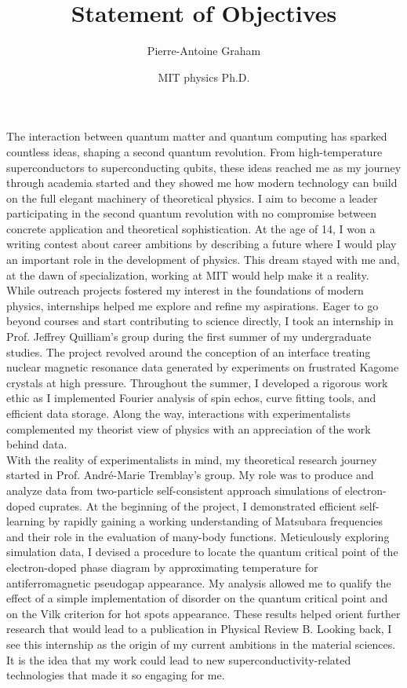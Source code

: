 \documentclass[12pt]{article}
\title{Statement of Objectives}
\author{Pierre-Antoine Graham}
\date{MIT physics Ph.D.}
\begin{document}
\maketitle
\vspace{0.5cm}

The interaction between quantum matter and quantum computing has sparked countless ideas, shaping a second quantum revolution. From high-temperature superconductors to superconducting qubits, these ideas reached me as my journey through academia started and they showed me how modern technology can build on the full elegant machinery of theoretical physics. I aim to become a leader participating in the second quantum revolution with no compromise between concrete application and theoretical sophistication. At the age of 14, I won a writing contest about career ambitions by describing a future where I would play an important role in the development of physics. This dream stayed with me and, at the dawn of specialization, working at MIT would help make it a reality.\\[0.2cm]

While outreach projects fostered my interest in the foundations of modern physics, internships helped me explore and refine my aspirations. Eager to go beyond courses and start contributing to science directly, I took an internship in Prof. Jeffrey Quilliam's group during the first summer of my undergraduate studies. The project revolved around the conception of an interface treating nuclear magnetic resonance data generated by experiments on frustrated Kagome crystals at high pressure. Throughout the summer, I developed a rigorous work ethic as I implemented Fourier analysis of spin echos, curve fitting tools, and efficient data storage. Along the way, interactions with experimentalists complemented my theorist view of physics with an appreciation of the work behind data.\\[0.2cm]

With the reality of experimentalists in mind, my theoretical research journey started in Prof. André-Marie Tremblay's group. My role was to produce and analyze data from two-particle self-consistent approach simulations of electron-doped cuprates. At the beginning of the project, I demonstrated efficient self-learning by rapidly gaining a working understanding of Matsubara frequencies and their role in the evaluation of many-body functions. Meticulously exploring simulation data, I devised a procedure to locate the quantum critical point of the electron-doped phase diagram by approximating temperature for antiferromagnetic pseudogap appearance. My analysis allowed me to qualify the effect of a simple implementation of disorder on the quantum critical point and on the Vilk criterion for hot spots appearance. These results helped orient further research that would lead to a publication in Physical Review B. Looking back, I see this internship as the origin of my current ambitions in the material sciences. It is the idea that my work could lead to new superconductivity-related technologies that made it so engaging for me.\\[0.2cm] 
\end{document}
